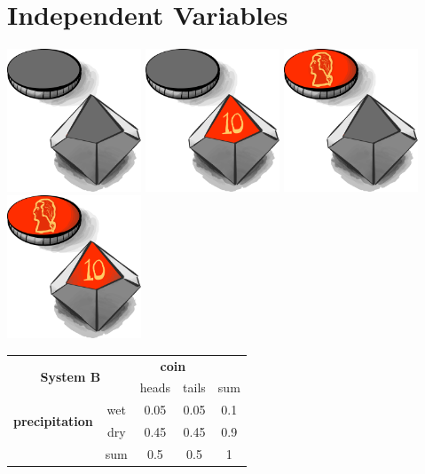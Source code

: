 \section{Independent Variables}

\includegraphics[width=0.3\textwidth]{img/grey-coin-grey-die}
\includegraphics[width=0.3\textwidth]{img/grey-coin-red-die}
\includegraphics[width=0.3\textwidth]{img/red-coin-grey-die}
\includegraphics[width=0.3\textwidth]{img/red-coin-red-die}

\begin{center}
 \begin{tabular}{c c || c | c || c}
 \multicolumn{2}{c}{\multirow{2}{*}{\textbf{System B}}} & \multicolumn{2}{c}{\textbf{coin}} & {}\\
\multicolumn{2}{c}{} & heads & tails & sum \\ [0.5ex]
 \hline\hline
\multirow{2}{*}{\textbf{precipitation}} & wet & 0.05 & 0.05 & 0.1 \\
 \cline{2-5}
 & dry & 0.45 & 0.45 & 0.9 \\
 \hline\hline
  {} & sum & 0.5 & 0.5 & 1 \\ [1ex]
\end{tabular}
\end{center}

